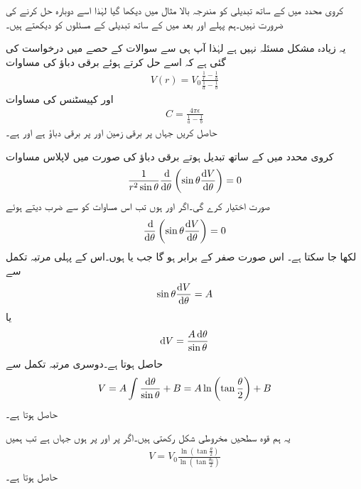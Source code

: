کروی محدد میں  کے ساتھ تبدیلی کو مندرجہ بالا مثال میں دیکھا گیا لہٰذا اسے دوبارہ حل کرنے کی ضرورت نہیں۔ہم پہلے  اور بعد میں  کے ساتھ تبدیلی کے مسئلوں کو دیکھتے ہیں۔

یہ زیادہ مشکل مسئلہ نہیں ہے لہٰذا آپ ہی سے سوالات کے حصے میں درخواست کی گئی ہے کہ اسے حل کرتے ہوئے برقی دباؤ کی مساوات 
\begin{align}\label{مساوات_لاپلاس_کروی_رداسی_لاپلاسی_دباو}
V(r)=V_0 \frac{\frac{1}{r}-\frac{1}{b}}{\frac{1}{a}-\frac{1}{b}}
\end{align}
اور کپیسٹنس کی مساوات 
\begin{align}\label{مساوات_لاپلاس_کروی_رداسی_لاپلاسی_کپیسٹنس}
C=\frac{4\pi \epsilon}{\frac{1}{a}-\frac{1}{b}}
\end{align}
حاصل کریں  جہاں  پر برقی زمین اور  پر  برقی دباؤ ہے اور  ہے۔

کروی محدد میں  کے ساتھ تبدیل ہوتے برقی دباؤ کی صورت میں لاپلاس مساوات
\begin{align}
\frac{1}{r^2 \sin \theta} \frac{\dif}{\dif \theta}\left(\sin \theta \frac{\dif V}{\dif \theta}\right)=0
\end{align}
صورت اختیار کرے گی۔اگر  اور  ہوں تب اس مساوات کو  سے ضرب دیتے ہوئے
\begin{align}
\frac{\dif}{\dif \theta}\left(\sin \theta \frac{\dif V}{\dif \theta}\right)=0
\end{align}
لکھا جا سکتا ہے۔ اس صورت صفر کے برابر ہو گا جب  یا  ہوں۔اس کے پہلی مرتبہ تکمل سے
\begin{align*}
\sin \theta \frac{\dif V}{\dif \theta}=A
\end{align*}
یا
\begin{align*}
\dif V=\frac{A \dif \theta}{\sin \theta}
\end{align*}
حاصل ہوتا ہے۔دوسری مرتبہ تکمل سے
\begin{align}\label{مساوات_لاپلاس_مخروطی_حل}
V=A\int \frac{\dif \theta}{\sin \theta}+B=A \ln \left(\tan \frac{\theta}{2}\right)+B
\end{align}
حاصل ہوتا ہے۔

یہ ہم قوہ سطحیں مخروطی شکل رکھتی ہیں۔اگر  پر  اور  پر  ہوں جہاں  ہے تب ہمیں
\begin{align}\label{مساوات_لاپلاس_مخروطی_حل_ب}
V=V_0 \frac{\ln \left(\tan \frac{\theta}{2} \right)}{\ln \left(\tan \frac{\theta_0}{2} \right)}
\end{align}
حاصل ہوتا ہے۔

